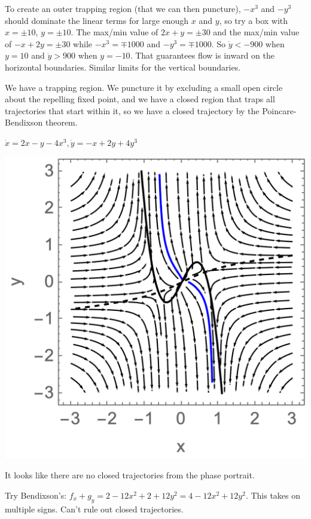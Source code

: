 \documentclass[12pt,letterpaper,answers]{exam}
\begin{document}
\begin{questions}
\begin{parts}
\begin{solution}
To create an outer trapping region (that we can then puncture), $-x^3$ and $-y^3$ should dominate the linear terms for large enough $x$ and $y$, so try a box with $x = \pm 10$, $y=\pm 10$.  The max/min value of $2x+y = \pm 30$ and the max/min value of $-x+2y = \pm 30$ while $-x^3 = \mp 1000$ and $-y^3 = \mp 1000$.  So $\dot y < -900$ when $y = 10$ and $\dot y > 900$ when $y = -10$.  That guarantees flow is inward on the horizontal boundaries.  Similar limits for the vertical boundaries.

We have a trapping region.  We puncture it by excluding a small open circle about the repelling fixed point, and we have a closed region that traps all trajectories that start within it, so we have a closed trajectory by the Poincare-Bendixson theorem.


    
    \end{solution}
    \item $\dot x = 2x-y-4x^3, \dot y = -x + 2y + 4y^3 $ 
    \begin{solution}

\includegraphics{img/PS07-S23-3.png}
    
It looks like there are no closed trajectories from the phase portrait.
    
Try Bendixson's: $f_x + g_y = 2 - 12x^2 +2 +12y^2 = 4 - 12x^2+12y^2$.  This takes on multiple signs.  Can't rule out closed trajectories.


\end{solution}
\end{parts}
\end{questions}
\end{document}
